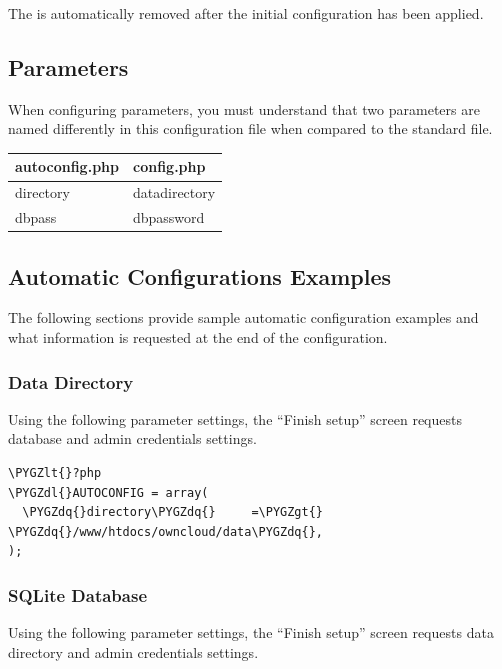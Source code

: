 \documentclass[letterpaper,10pt,english]{sphinxmanual}
\def\PYGZlt{\char`\<}
\def\PYGZgt{\char`\>}
\def\PYGZdl{\char`\$}
\def\PYGZdq{\char`\"}
\begin{document}
The  is automatically removed after the initial configuration has been applied.


\subsection{Parameters}
\label{configuration_server/automatic_configuration:parameters}
When configuring parameters, you must understand that two parameters are named differently in this configuration file when compared to the standard  file.

\begin{tabulary}{\linewidth}{|L|L|}
\hline
\textsf{\relax 
autoconfig.php
} & \textsf{\relax 
config.php
}\\
\hline
directory
 & 
datadirectory
\\
\hline
dbpass
 & 
dbpassword
\\
\hline\end{tabulary}



\subsection{Automatic Configurations Examples}
\label{configuration_server/automatic_configuration:automatic-configurations-examples}
The following sections provide sample automatic configuration examples and what information is requested at the end of the configuration.


\subsubsection{Data Directory}
\label{configuration_server/automatic_configuration:data-directory}
Using the following parameter settings, the ``Finish setup'' screen requests database and admin credentials settings.

\begin{Verbatim}[commandchars=\\\{\}]
\PYGZlt{}?php
\PYGZdl{}AUTOCONFIG = array(
  \PYGZdq{}directory\PYGZdq{}     =\PYGZgt{} \PYGZdq{}/www/htdocs/owncloud/data\PYGZdq{},
);
\end{Verbatim}


\subsubsection{SQLite Database}
\label{configuration_server/automatic_configuration:sqlite-database}
Using the following parameter settings, the ``Finish setup'' screen requests data directory and admin credentials settings.
\end{document}
